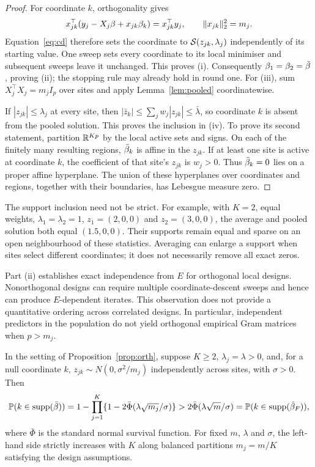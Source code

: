 \begin{proof}
For coordinate $k$, orthogonality gives
\[
 x_{jk}^\top(y_j-X_j\beta+x_{jk}\beta_k)
 =x_{jk}^\top y_j,
 \qquad \|x_{jk}\|_2^2=m_j.
\]
Equation~\eqref{eq:cd} therefore sets the coordinate to
$\mathcal{S}(z_{jk},\lambda_j)$ independently of its starting value. One sweep
sets every coordinate to its local minimiser and subsequent sweeps leave
it unchanged. This proves (i). Consequently $\beta_1=\beta_2=\bar{\beta}$,
proving (ii); the stopping rule may already hold in round one.
For (iii), sum $X_j^\top X_j=m_jI_p$ over sites and apply
Lemma~\ref{lem:pooled} coordinatewise.

If $|z_{jk}|\le\lambda_j$ at every site, then
$|\bar z_k|\le\sum_jw_j|z_{jk}|\le\bar\lambda$, so coordinate $k$ is
absent from the pooled solution. This proves the inclusion in (iv).
To prove its second statement, partition $\mathbb{R}^{Kp}$ by the local active
sets and signs. On each of the finitely many resulting regions,
$\bar{\beta}_k$ is affine in the $z_{jk}$. If at least one site is active at
coordinate $k$, the coefficient of that site's $z_{jk}$ is $w_j>0$.
Thus $\bar{\beta}_k=0$ lies on a proper affine hyperplane. The union of these
hyperplanes over coordinates and regions, together with their boundaries,
has Lebesgue measure zero.
\end{proof}

The support inclusion need not be strict. For example, with $K=2$, equal
weights, $\lambda_1=\lambda_2=1$, $z_1=(2,0,0)$ and $z_2=(3,0,0)$,
the average and pooled solution both equal $(1.5,0,0)$. Their supports
remain equal and sparse on an open neighbourhood of these statistics.
Averaging can enlarge a support when sites select different coordinates;
it does not necessarily remove all exact zeros.

Part (ii) establishes exact independence from $E$ for orthogonal local
designs. Nonorthogonal designs can require multiple coordinate-descent
sweeps and hence can produce $E$-dependent iterates. This observation does
not provide a quantitative ordering across correlated designs. In
particular, independent predictors in the population do not yield
orthogonal empirical Gram matrices when $p>m_j$.

\begin{corollary}
\label{cor:fp}
In the setting of Proposition~\ref{prop:orth}, suppose $K\ge2$,
$\lambda_j=\lambda>0$, and, for a null coordinate $k$,
$z_{jk}\sim N(0,\sigma^2/m_j)$ independently across sites, with $\sigma>0$.
Then
\[
\mathbb{P}(k\in\operatorname{supp}(\bar{\beta}))
 =1-\prod_{j=1}^K\{1-2\bar\Phi(\lambda\sqrt{m_j}/\sigma)\}
 >2\bar\Phi(\lambda\sqrt m/\sigma)
 =\mathbb{P}(k\in\operatorname{supp}(\hat{\beta}_F)),
\]
where $\bar\Phi$ is the standard normal survival function. For fixed
$m$, $\lambda$ and $\sigma$, the left-hand side strictly increases with
$K$ along balanced partitions $m_j=m/K$ satisfying the design assumptions.
\end{corollary}


